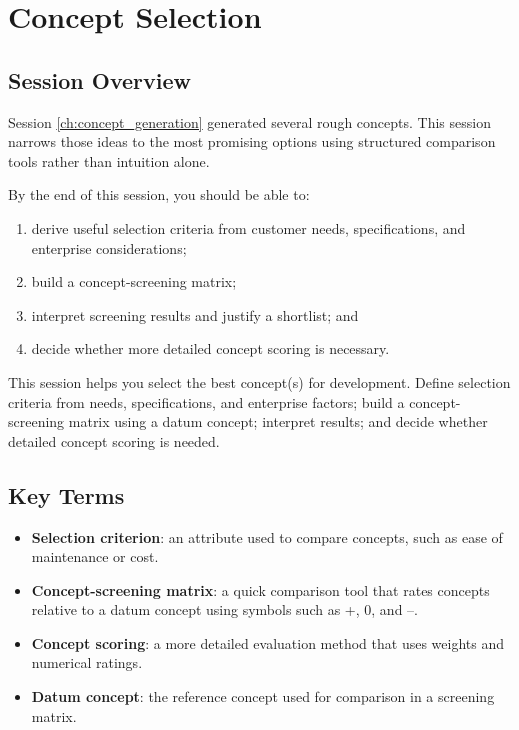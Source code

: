 \chapter{Concept Selection}
\label{ch:concept_selection}
\section{Session Overview}

Session \ref{ch:concept_generation} generated several rough concepts. This session narrows those ideas to the most promising options using structured comparison tools rather than intuition alone.

By the end of this session, you should be able to:
\begin{enumerate}
    \item derive useful selection criteria from customer needs, specifications, and enterprise considerations;
    \item build a concept-screening matrix;
    \item interpret screening results and justify a shortlist; and
    \item decide whether more detailed concept scoring is necessary.
\end{enumerate}

\begin{tcolorbox}[title=Goal]
This session helps you select the best concept(s) for development. Define selection criteria from needs, specifications, and enterprise factors; build a concept-screening matrix using a datum concept; interpret results; and decide whether detailed concept scoring is needed.
\end{tcolorbox}

\section{Key Terms}

\begin{itemize}
    \item \textbf{Selection criterion}: an attribute used to compare concepts, such as ease of maintenance or cost.
    \item \textbf{Concept-screening matrix}: a quick comparison tool that rates concepts relative to a datum concept using symbols such as +, 0, and --.
    \item \textbf{Concept scoring}: a more detailed evaluation method that uses weights and numerical ratings.
    \item \textbf{Datum concept}: the reference concept used for comparison in a screening matrix.
\end{itemize}

